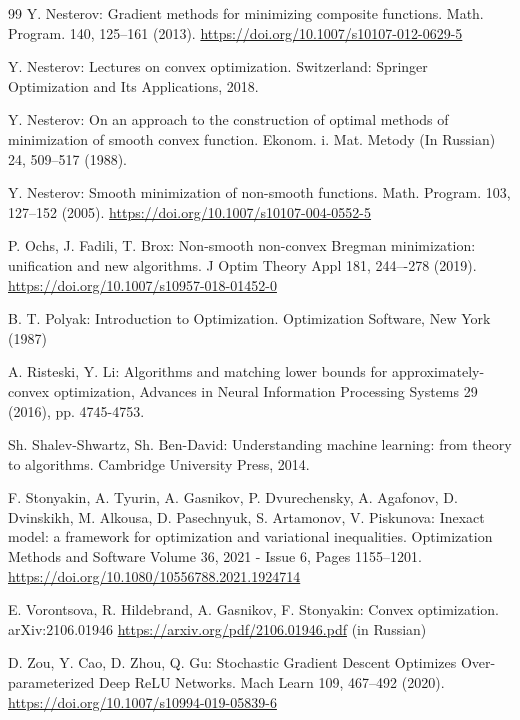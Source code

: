 \documentclass[11pt]{amsart}
\theoremstyle{definition}
\numberwithin{equation}{section}
\begin{document}
\begin{thebibliography}{99}
Y. Nesterov: Gradient methods for minimizing composite functions. Math. Program. 140, 125–161 (2013). \url{https://doi.org/10.1007/s10107-012-0629-5}

Y. Nesterov: Lectures on convex optimization. Switzerland: Springer Optimization and Its Applications, 2018.

Y. Nesterov: On an approach to the construction of optimal methods of minimization of smooth convex function. Ekonom. i. Mat. Metody (In Russian) 24, 509–517 (1988).

Y. Nesterov: Smooth minimization of non-smooth functions. Math. Program. 103, 127–152 (2005). \url{https://doi.org/10.1007/s10107-004-0552-5}

P. Ochs, J. Fadili, T. Brox: Non-smooth non-convex Bregman minimization: unification and new algorithms. J Optim Theory Appl 181, 244–-278 (2019). \url{https://doi.org/10.1007/s10957-018-01452-0}

B. T. Polyak: Introduction to Optimization. Optimization Software, New York (1987)

A. Risteski, Y. Li: Algorithms and matching lower bounds for approximately-convex optimization, Advances in Neural Information Processing Systems 29 (2016), pp. 4745-4753.

Sh. Shalev-Shwartz, Sh. Ben-David: Understanding machine learning: from theory to algorithms. Cambridge University Press, 2014.

F. Stonyakin, A. Tyurin, A. Gasnikov, P. Dvurechensky, A. Agafonov, D. Dvinskikh, M. Alkousa, D. Pasechnyuk, S. Artamonov, V. Piskunova: Inexact model: a framework for optimization and variational inequalities. Optimization Methods and Software Volume 36, 2021 - Issue 6, Pages 1155--1201. \url{https://doi.org/10.1080/10556788.2021.1924714}

E. Vorontsova, R. Hildebrand, A. Gasnikov, F. Stonyakin: Convex optimization. arXiv:2106.01946 \url{https://arxiv.org/pdf/2106.01946.pdf} (in Russian)

D. Zou, Y. Cao, D. Zhou, Q. Gu: Stochastic Gradient Descent Optimizes Over-parameterized Deep ReLU Networks. Mach Learn 109, 467–492 (2020). \url{https://doi.org/10.1007/s10994-019-05839-6}

\end{thebibliography}
\end{document}

